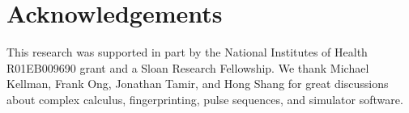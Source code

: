 \documentclass{article}
\begin{document}
\section{Acknowledgements}

This research was supported in part by the National Institutes of Health  R01EB009690 grant and a Sloan Research Fellowship. We thank  Michael Kellman, Frank Ong, Jonathan Tamir, and Hong Shang for great discussions about complex calculus, fingerprinting, pulse sequences, and simulator software.



\end{document}
